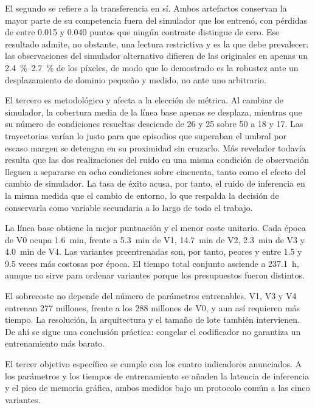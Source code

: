 El segundo se refiere a la transferencia en s\'i. Ambos artefactos conservan la mayor parte
de su competencia fuera del simulador que los entren\'o, con p\'erdidas de entre \num{0.015}
y \num{0.040} puntos que ning\'un contraste distingue de cero. Ese resultado admite, no
obstante, una lectura restrictiva y es la que debe prevalecer: las observaciones del
simulador alternativo difieren de las originales en apenas un
\SIrange{2.4}{2.7}{\percent} de los p\'ixeles, de modo que lo demostrado es la robustez ante
un desplazamiento de dominio peque\~no y medido, no ante uno arbitrario.

El tercero es metodol\'ogico y afecta a la elecci\'on de m\'etrica. Al cambiar de simulador,
la cobertura media de la l\'inea base apenas se desplaza, mientras que su n\'umero de
condiciones resueltas desciende de \num{26} y \num{25} sobre \num{50} a \num{18} y \num{17}.
Las trayectorias var\'ian lo justo para que episodios que superaban el umbral por escaso
margen se detengan en su proximidad sin cruzarlo. M\'as revelador todav\'ia resulta que las
dos realizaciones del ruido en una misma condici\'on de observaci\'on lleguen a separarse en
ocho condiciones sobre cincuenta, tanto como el efecto del cambio de simulador. La tasa de
\'exito acusa, por tanto, el ruido de inferencia en la misma medida que el cambio de entorno,
lo que respalda la decisi\'on de conservarla como variable secundaria a lo largo de todo el
trabajo.


La l\'inea base obtiene la mejor puntuaci\'on y el menor coste unitario. Cada \'epoca de V0
ocupa \SI{1.6}{\minute}, frente a \SI{5.3}{\minute} de V1, \SI{14.7}{\minute} de V2,
\SI{2.3}{\minute} de V3 y \SI{4.0}{\minute} de V4. Las variantes preentrenadas son, por
tanto, peores y entre \num{1.5} y \num{9.5} veces m\'as costosas por \'epoca. El tiempo
total conjunto asciende a \SI{237.1}{\hour}, aunque no sirve para ordenar variantes porque
los presupuestos fueron distintos.

El sobrecoste no depende del n\'umero de par\'ametros entrenables. V1, V3 y V4 entrenan
\num{277} millones, frente a los \num{288} millones de V0, y aun as\'i requieren m\'as
tiempo. La resoluci\'on, la arquitectura y el tama\~no de lote tambi\'en intervienen. De ah\'i
se sigue una conclusi\'on pr\'actica: congelar el codificador no garantiza un entrenamiento
m\'as barato.

El tercer objetivo espec\'ifico se cumple con los cuatro indicadores anunciados. A los
par\'ametros y los tiempos de entrenamiento se a\~naden la latencia de inferencia y el pico
de memoria gr\'afica, ambos medidos bajo un protocolo com\'un a las cinco variantes.

